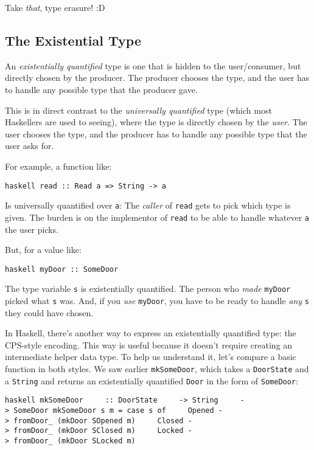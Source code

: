 \documentclass[]{article}
\begin{document}
Take \emph{that}, type erasure! :D

\subsection{The Existential Type}

An \emph{existentially quantified} type is one that is hidden to the
user/consumer, but directly chosen by the producer. The producer chooses the
type, and the user has to handle any possible type that the producer gave.

This is in direct contrast to the \emph{universally quantified} type (which most
Haskellers are used to seeing), where the type is directly chosen by the
\emph{user}. The user chooses the type, and the producer has to handle any
possible type that the user asks for.

For example, a function like:

\texttt{haskell\ read\ ::\ Read\ a\ =\textgreater{}\ String\ -\textgreater{}\ a}

Is universally quantified over \texttt{a}: The \emph{caller} of \texttt{read}
gets to pick which type is given. The burden is on the implementor of
\texttt{read} to be able to handle whatever \texttt{a} the user picks.

But, for a value like:

\texttt{haskell\ myDoor\ ::\ SomeDoor}

The type variable \texttt{s} is existentially quantified. The person who
\emph{made} \texttt{myDoor} picked what \texttt{s} was. And, if you \emph{use}
\texttt{myDoor}, you have to be ready to handle \emph{any} \texttt{s} they could
have chosen.

In Haskell, there's another way to express an existentially quantified type: the
CPS-style encoding. This way is useful because it doesn't require creating an
intermediate helper data type. To help us understand it, let's compare a basic
function in both styles. We saw earlier \texttt{mkSomeDoor}, which takes a
\texttt{DoorState} and a \texttt{String} and returns an existentially quantified
\texttt{Door} in the form of \texttt{SomeDoor}:

\texttt{haskell\ mkSomeDoor\ \ \ \ \ ::\ DoorState\ \ \ \ \ -\textgreater{}\ String\ \ \ \ \ -\textgreater{}\ SomeDoor\ mkSomeDoor\ s\ m\ =\ case\ s\ of\ \ \ \ \ Opened\ -\textgreater{}\ fromDoor\_\ (mkDoor\ SOpened\ m)\ \ \ \ \ Closed\ -\textgreater{}\ fromDoor\_\ (mkDoor\ SClosed\ m)\ \ \ \ \ Locked\ -\textgreater{}\ fromDoor\_\ (mkDoor\ SLocked\ m)}
\end{document}
